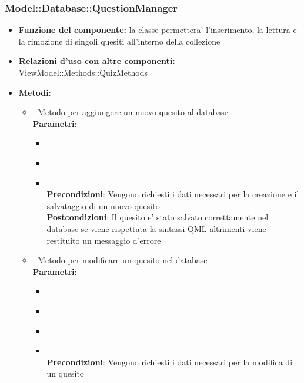 \subsubsection{Model::Database::QuestionManager}
\begin{itemize}
\item\textbf{Funzione del componente:} la classe permettera' l'inserimento, la lettura e la rimozione di singoli quesiti all'interno della collezione
\item\textbf{Relazioni d'uso con altre componenti:} ViewModel::Methods::QuizMethods\\
\item\textbf{Metodi}:
	\begin{itemize}
		\item{} : Metodo per aggiungere un nuovo quesito al database\\
		\textbf{Parametri}:
			\begin{itemize}
				\item{}\\
				\item{}\\
				\item{}\\
				\textbf{Precondizioni}: Vengono richiesti i dati necessari per la creazione e il salvataggio di un nuovo quesito\\
				\textbf{Postcondizioni}: Il quesito e' stato salvato correttamente nel database se viene rispettata la sintassi QML altrimenti viene restituito un messaggio d'errore\\
			\end{itemize}
		\item{} : Metodo per modificare un quesito nel database\\
		\textbf{Parametri}:
			\begin{itemize}
				\item{}\\
				\item{}\\
				\item{}\\
				\item{}\\
				\textbf{Precondizioni}: Vengono richiesti i dati necessari per la modifica di un quesito\\

\end{itemize}
\end{itemize}
\end{itemize}
